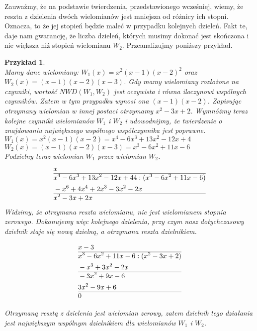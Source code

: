 \documentclass[oneside,a4paper]{book}
\newtheorem{example}{Przykład}
\begin{document}
	Zauważmy, że na podstawie twierdzenia, przedstawionego wcześniej, wiemy, że reszta z dzielenia dwóch wielomianów jest mniejsza od różnicy ich stopni. Oznacza, to że jej stopień będzie maleć w przypadku kolejnych dzieleń. Fakt te, daje nam gwarancję, że liczba dzieleń, których musimy dokonać jest skończona i nie większa niż stopień wielomianu $W_2$. Przeanalizujmy poniższy przykład.
	\begin{example}
		$ $\\
		Mamy dane wielomiany: $W_1(x) = x^2(x-1)(x-2)^2$ oraz $W_2(x) = (x-1)(x-2)(x-3)$. Gdy mamy wielomiany rozłożone na czynniki, wartość $NWD(W_1, W_2)$ jest oczywista i równa iloczynowi wspólnych czynników. Zatem w tym przypadku wynosi ona $(x-1)(x-2)$. Zapisując otrzymany wielomian w innej postaci otrzymamy $x^2-3x+2$. Wymnóżmy teraz kolejne czynniki wielomianów $W_1$ i $W_2$ i udowodnijmy, że twierdzenie o znajdowaniu największego wspólnego współczynnika jest poprawne. \\
		$W_1(x) = x^2(x-1)(x-2) = x^4-6x^3+13x^2-12x+4$ \\
		$W_2(x) = (x-1)(x-2)(x-3) = x^3-6x^2+11x-6$ \\
		Podzielny teraz wielomian $W_1$ przez wielomian $W_2$. \\
		\begin{equation}
		\begin{split}
		&x\\\hline
		&x^4-6x^3+13x^2-12x+44 : (x^3-6x^2+11x-6) \\
		&-x^6+4x^4+2x^3-3x^2-2x \\\hline
		&x^2-3x+2x \\
		\end{split}
		\end{equation}
		Widzimy, że otrzymana reszta wielomianu, nie jest wielomianem stopnia zerowego. Dokonujemy więc kolejnego dzielenia, przy czym nasz dotychczasowy dzielnik staje się nową dzielną, a otrzymana reszta dzielnikiem.
		
		\begin{equation}
		\begin{split}
		&x-3\\\hline
		&x^3-6x^2+11x-6 : (x^2-3x+2) \\
		&-x^3+3x^2-2x \\\hline
		&-3x^2+9x-6 \\
		&3x^2-9x+6  \\\hline
		&0\\
		\end{split}
		\end{equation}
		
		Otrzymaną resztą z dzielenia jest wielomian zerowy, zatem dzielnik tego działania jest największym wspólnym dzielnikiem dla wielomianów $W_1$ i $W_2$.
	\end{example}
	
\end{document}
